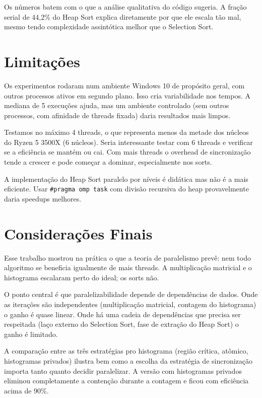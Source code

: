 \documentclass[12pt]{article}
\begin{document}
Os números batem com o que a análise qualitativa do código sugeria. A fração serial de 44,2\% do Heap Sort explica diretamente por que ele escala tão mal, mesmo tendo complexidade assintótica melhor que o Selection Sort.

\section{Limitações}

Os experimentos rodaram num ambiente Windows 10 de propósito geral, com outros processos ativos em segundo plano. Isso cria variabilidade nos tempos. A mediana de 5 execuções ajuda, mas um ambiente controlado (sem outros processos, com afinidade de threads fixada) daria resultados mais limpos.

Testamos no máximo 4 threads, o que representa menos da metade dos núcleos do Ryzen 5 3500X (6 núcleos). Seria interessante testar com 6 threads e verificar se a eficiência se mantém ou cai. Com mais threads o overhead de sincronização tende a crescer e pode começar a dominar, especialmente nos sorts.

A implementação do Heap Sort paralelo por níveis é didática mas não é a mais eficiente. Usar \texttt{\#pragma omp task} com divisão recursiva do heap provavelmente daria speedups melhores.

\section{Considerações Finais}

Esse trabalho mostrou na prática o que a teoria de paralelismo prevê: nem todo algoritmo se beneficia igualmente de mais threads. A multiplicação matricial e o histograma escalaram perto do ideal; os sorts não.

O ponto central é que paralelizabilidade depende de dependências de dados. Onde as iterações são independentes (multiplicação matricial, contagem do histograma) o ganho é quase linear. Onde há uma cadeia de dependências que precisa ser respeitada (laço externo do Selection Sort, fase de extração do Heap Sort) o ganho é limitado.

A comparação entre as três estratégias pro histograma (região crítica, atômico, histogramas privados) ilustra bem como a escolha da estratégia de sincronização importa tanto quanto decidir paralelizar. A versão com histogramas privados eliminou completamente a contenção durante a contagem e ficou com eficiência acima de 90\%.
\end{document}
